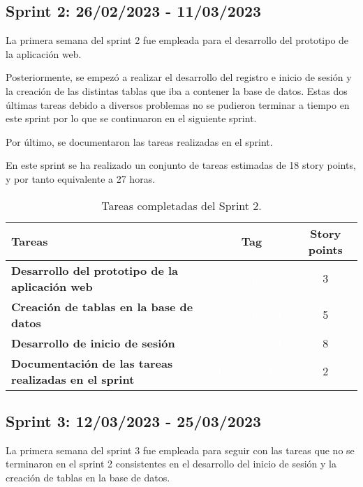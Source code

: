 \subsection{Sprint 2: 26/02/2023 - 11/03/2023}
La primera semana del sprint 2 fue empleada para el desarrollo del prototipo de la aplicación web.

Posteriormente, se empezó a realizar el desarrollo del registro e inicio de sesión y la creación de las distintas tablas que iba a contener la base de datos. Estas dos últimas tareas debido a diversos problemas no se pudieron terminar a tiempo en este sprint por lo que se continuaron en el siguiente sprint.

Por último, se documentaron las tareas realizadas en el sprint.

En este sprint se ha realizado un conjunto de tareas estimadas de 18 story points, y por tanto equivalente a 27 horas.

\begin{table}[ht!]
    \centering
    \resizebox{15cm}{!} {
    \begin{tabular}{|l|c|c|}
    \hline
    \rowcolor[rgb]{0.99,0.93,0.93}
    \textbf{Tareas}     &\textbf{Tag}     & \textbf{Story points} \\ \hline
    \textbf{Desarrollo del prototipo de la aplicación web}         &\cellcolor[rgb]{0.99,0.83,0.93}\textcolor{white}{development}      &3 \\ \hline 
    \textbf{Creación de tablas en la base de datos}         &\cellcolor[rgb]{0.99,0.83,0.93}\textcolor{white}{development}      &5 \\ \hline 
    \textbf{Desarrollo de inicio de sesión}         &\cellcolor[rgb]{0.99,0.83,0.93}\textcolor{white}{development}      &8 \\ \hline 
    \textbf{Documentación de las tareas realizadas en el sprint}         &\cellcolor[rgb]{0.0,0.33,0.71}\textcolor{white}{documentation}      &2 \\ \hline 
    \end{tabular}}
    \caption{Tareas completadas del Sprint 2.}
    \label{tab:my_label}
\end{table}

\subsection{Sprint 3: 12/03/2023 - 25/03/2023}
La primera semana del sprint 3 fue empleada para seguir con las tareas que no se terminaron en el sprint 2 consistentes en el desarrollo del inicio de sesión y la creación de tablas en la base de datos.

